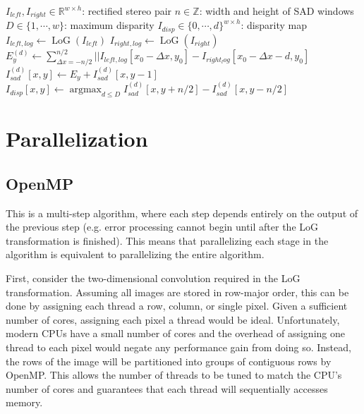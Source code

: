 \documentclass{article}
\DeclareMathOperator*{\argmin}{argmax}
\DeclareMathOperator{\LoG}{LoG}
\begin{document}
\begin{algorithm}
    \begin{algorithmic}
    \REQUIRE $I_{left}, I_{right} \in \mathbb{R}^{w \times h}$: rectified stereo pair
    \REQUIRE $n \in \mathbb{Z}$: width and height of SAD windows
    \REQUIRE $D \in \{1, \cdots, w\}$: maximum disparity
    \ENSURE $I_{disp} \in \{0, \cdots, d\}^{w \times h}$: disparity map
    \STATE $I_{left,log} \gets \LoG(I_{left})$
    \STATE $I_{right,log} \gets \LoG(I_{right})$
    \STATE {}
            \STATE $E_y^{(d)} \gets \sum_{\Delta x = -n/2}^{n/2}{
                                      ||I_{left,log}[x_0 - \Delta x, y_0]
                                      - I_{right_log}[x_0 - \Delta x - d, y_0]}$
            \STATE $I_{sad}^{(d)}[x, y] \gets E_y + I_{sad}^{(d)}[x, y - 1]$
        \ENDFOR
    \ENDFOR
    \STATE {}
        \STATE $I_{disp}[x, y] \gets \argmin_{d \le D} I_{sad}^{(d)}[x, y + n/2] - I_{sad}^{(d)}[x, y - n/2]$
    \ENDFOR
    \end{algorithmic}
\end{algorithm}

\section{Parallelization}
\label{sec:parallel}

\subsection{OpenMP}
\label{sec:parallel-omp}
This is a multi-step algorithm, where each step depends entirely on the output
of the previous step (e.g. error processing cannot begin until after the LoG
transformation is finished). This means that parallelizing each stage in the
algorithm is equivalent to parallelizing the entire algorithm.

First, consider the two-dimensional convolution required in the LoG
transformation. Assuming all images are stored in row-major order, this can be
done by assigning each thread a row, column, or single pixel. Given a
sufficient number of cores, assigning each pixel a thread would be ideal.
Unfortunately, modern CPUs have a small number of cores and the overhead of
assigning one thread to each pixel would negate any performance gain from doing
so. Instead, the rows of the image will be partitioned into groups of
contiguous rows by OpenMP. This allows the number of threads to be tuned to
match the CPU's number of cores and guarantees that each thread will
sequentially accesses memory.
\end{document}
